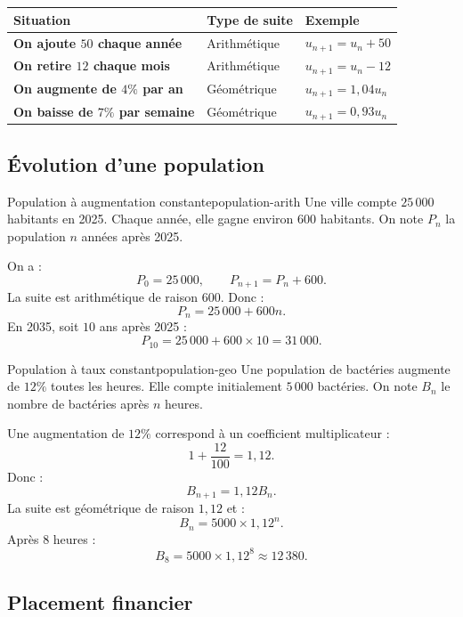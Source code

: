 \documentclass[11pt,a4paper]{article}
\begin{document}
\begin{center}
\begin{tabularx}{0.95\textwidth}{|>{\bfseries}p{4cm}|X|X|}
\hline
Situation & Type de suite & Exemple \\
\hline
On ajoute $50$ chaque année & Arithmétique & $u_{n+1}=u_n+50$ \\
\hline
On retire $12$ chaque mois & Arithmétique & $u_{n+1}=u_n-12$ \\
\hline
On augmente de $4\%$ par an & Géométrique & $u_{n+1}=1{,}04u_n$ \\
\hline
On baisse de $7\%$ par semaine & Géométrique & $u_{n+1}=0{,}93u_n$ \\
\hline
\end{tabularx}
\end{center}

\subsection{Évolution d'une population}

\begin{examplebox}{Population à augmentation constante}{population-arith}
Une ville compte $25\,000$ habitants en 2025. Chaque année, elle gagne environ $600$ habitants. On note $P_n$ la population $n$ années après 2025.

On a :
\[
P_0=25\,000,
\qquad
P_{n+1}=P_n+600.
\]
La suite est arithmétique de raison $600$.
Donc :
\[
P_n=25\,000+600n.
\]
En 2035, soit $10$ ans après 2025 :
\[
P_{10}=25\,000+600\times10=31\,000.
\]
\end{examplebox}

\begin{examplebox}{Population à taux constant}{population-geo}
Une population de bactéries augmente de $12\%$ toutes les heures. Elle compte initialement $5\,000$ bactéries. On note $B_n$ le nombre de bactéries après $n$ heures.

Une augmentation de $12\%$ correspond à un coefficient multiplicateur :
\[
1+\frac{12}{100}=1{,}12.
\]
Donc :
\[
B_{n+1}=1{,}12B_n.
\]
La suite est géométrique de raison $1{,}12$ et :
\[
B_n=5000\times1{,}12^n.
\]
Après $8$ heures :
\[
B_8=5000\times1{,}12^8\approx12\,380.
\]
\end{examplebox}

\subsection{Placement financier}
\end{document}
